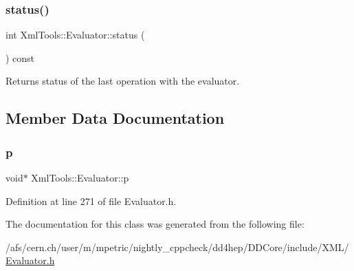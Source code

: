\subsubsection{\texorpdfstring{status()}{status()}}
{\footnotesize\ttfamily int Xml\+Tools\+::\+Evaluator\+::status (\begin{DoxyParamCaption}{ }\end{DoxyParamCaption}) const}

Returns status of the last operation with the evaluator. 

\subsection{Member Data Documentation}
\hypertarget{class_xml_tools_1_1_evaluator_aa7c19df1b96202c09024f7b7f4942364}{}\label{class_xml_tools_1_1_evaluator_aa7c19df1b96202c09024f7b7f4942364} 
\subsubsection{\texorpdfstring{p}{p}}
{\footnotesize\ttfamily void$\ast$ Xml\+Tools\+::\+Evaluator\+::p\hspace{0.3cm}{\ttfamily [private]}}



Definition at line 271 of file Evaluator.\+h.



The documentation for this class was generated from the following file\+:\begin{DoxyCompactItemize}
\item 
/afs/cern.\+ch/user/m/mpetric/nightly\+\_\+cppcheck/dd4hep/\+D\+D\+Core/include/\+X\+M\+L/\hyperlink{_evaluator_8h}{Evaluator.\+h}\end{DoxyCompactItemize}
